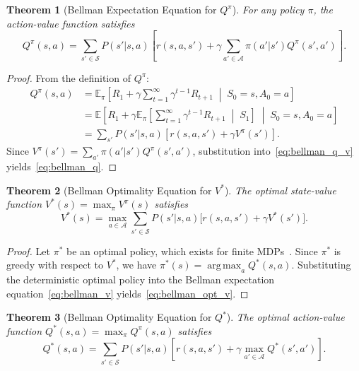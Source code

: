 \documentclass[11pt,a4paper]{article}
\theoremstyle{definition}
\theoremstyle{plain}
\newtheorem{theorem}{Theorem}[section]
\theoremstyle{remark}
\DeclareMathOperator*{\argmax}{arg\,max}
\newcommand{\E}{\mathbb{E}}
\begin{document}
\begin{theorem}[Bellman Expectation Equation for $Q^\pi$]
\label{thm:bellman_q}
For any policy $\pi$, the action-value function satisfies
\begin{equation}
    Q^\pi(s,a) = \sum_{s' \in \mathcal{S}} P(s'|s,a)\!\left[r(s,a,s') + \gamma \sum_{a' \in \mathcal{A}} \pi(a'|s') Q^\pi(s',a')\right].
    \label{eq:bellman_q}
\end{equation}
\end{theorem}

\begin{proof}
From the definition of $Q^\pi$:
\begin{align}
    Q^\pi(s,a) &= \E_\pi\!\left[R_1 + \gamma \sum_{t=1}^{\infty} \gamma^{t-1} R_{t+1} \;\middle|\; S_0 = s, A_0 = a\right] \nonumber\\
    &= \E\!\left[R_1 + \gamma \E_\pi\!\left[\sum_{t=1}^{\infty} \gamma^{t-1} R_{t+1} \;\middle|\; S_1\right] \;\middle|\; S_0=s, A_0=a\right] \nonumber\\
    &= \sum_{s'} P(s'|s,a)\!\left[r(s,a,s') + \gamma V^\pi(s')\right]. \label{eq:bellman_q_v}
\end{align}
Since $V^\pi(s') = \sum_{a'} \pi(a'|s') Q^\pi(s',a')$, substitution into~\eqref{eq:bellman_q_v} yields~\eqref{eq:bellman_q}.
\end{proof}

\begin{theorem}[Bellman Optimality Equation for $V^*$]
\label{thm:bellman_opt_v}
The optimal state-value function $V^*(s) = \max_\pi V^\pi(s)$ satisfies
\begin{equation}
    V^*(s) = \max_{a \in \mathcal{A}} \sum_{s' \in \mathcal{S}} P(s'|s,a)\bigl[r(s,a,s') + \gamma V^*(s')\bigr].
    \label{eq:bellman_opt_v}
\end{equation}
\end{theorem}

\begin{proof}
Let $\pi^*$ be an optimal policy, which exists for finite MDPs~\cite{bertsekas1996}. Since $\pi^*$ is greedy with respect to $V^*$, we have $\pi^*(s) = \argmax_a Q^*(s,a)$. Substituting the deterministic optimal policy into the Bellman expectation equation~\eqref{eq:bellman_v} yields~\eqref{eq:bellman_opt_v}.
\end{proof}

\begin{theorem}[Bellman Optimality Equation for $Q^*$]
\label{thm:bellman_opt_q}
The optimal action-value function $Q^*(s,a) = \max_\pi Q^\pi(s,a)$ satisfies
\begin{equation}
    Q^*(s,a) = \sum_{s' \in \mathcal{S}} P(s'|s,a)\!\left[r(s,a,s') + \gamma \max_{a' \in \mathcal{A}} Q^*(s',a')\right].
    \label{eq:bellman_opt_q}
\end{equation}
\end{theorem}
\end{document}
